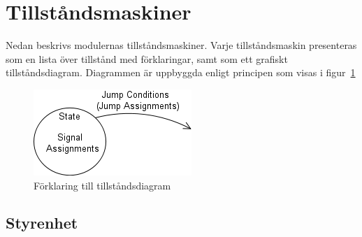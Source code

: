\documentclass[a4paper,11pt]{article}
\begin{document}
\pagebreak

\section{Tillståndsmaskiner}

	Nedan beskrivs modulernas tillståndsmaskiner. Varje tillståndsmaskin presenteras
	som en lista över tillstånd med förklaringar, samt som ett grafiskt tillståndsdiagram.
	Diagrammen är uppbyggda enligt principen som visas i figur~\ref{fig:SMExp}\\
	
	\begin{figure}[H]
	  \centering
	      \includegraphics[scale=0.5, angle=0]{StateMachineExplained.png}		
	  	\caption{Förklaring till tillståndsdiagram}	
		\label{fig:SMExp}
	\end{figure}
	
\label{sec:Tillstandsmaskiner}	

\pagebreak
	
\subsection{Styrenhet}
\end{document}
